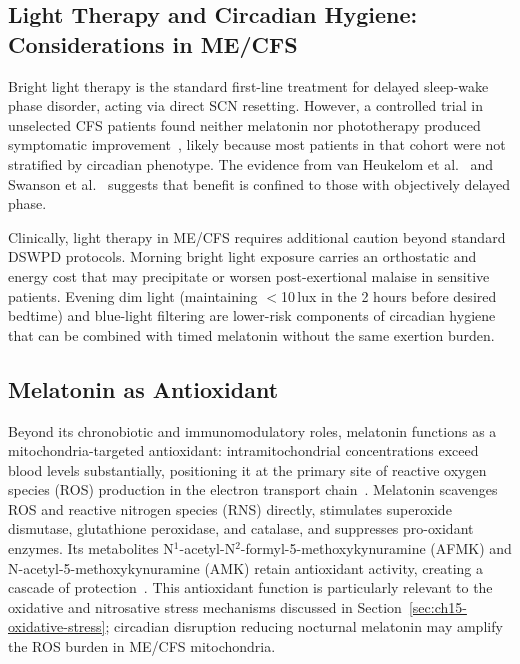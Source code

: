 \subsection{Light Therapy and Circadian Hygiene: Considerations in ME/CFS}

Bright light therapy is the standard first-line treatment for delayed sleep-wake phase disorder, acting via direct SCN resetting. However, a controlled trial in unselected CFS patients found neither melatonin nor phototherapy produced symptomatic improvement~\cite{williams2002therapy}, likely because most patients in that cohort were not stratified by circadian phenotype. The evidence from van Heukelom et al.~\cite{vanHeukelom2006melatonin} and Swanson et al.~\cite{Swanson2024DLMO} suggests that benefit is confined to those with objectively delayed phase.

Clinically, light therapy in ME/CFS requires additional caution beyond standard DSWPD protocols. Morning bright light exposure carries an orthostatic and energy cost that may precipitate or worsen post-exertional malaise in sensitive patients. Evening dim light (maintaining $<$10\,lux in the 2 hours before desired bedtime) and blue-light filtering are lower-risk components of circadian hygiene that can be combined with timed melatonin without the same exertion burden.

\subsection{Melatonin as Antioxidant}

Beyond its chronobiotic and immunomodulatory roles, melatonin functions as a mitochondria-targeted antioxidant: intramitochondrial concentrations exceed blood levels substantially, positioning it at the primary site of reactive oxygen species (ROS) production in the electron transport chain~\cite{Reiter2016antioxidant}. Melatonin scavenges ROS and reactive nitrogen species (RNS) directly, stimulates superoxide dismutase, glutathione peroxidase, and catalase, and suppresses pro-oxidant enzymes. Its metabolites N$^1$-acetyl-N$^2$-formyl-5-methoxykynuramine (AFMK) and N-acetyl-5-methoxykynuramine (AMK) retain antioxidant activity, creating a cascade of protection~\cite{Reiter2016antioxidant}. This antioxidant function is particularly relevant to the oxidative and nitrosative stress mechanisms discussed in Section~\ref{sec:ch15-oxidative-stress}; circadian disruption reducing nocturnal melatonin may amplify the ROS burden in ME/CFS mitochondria.

